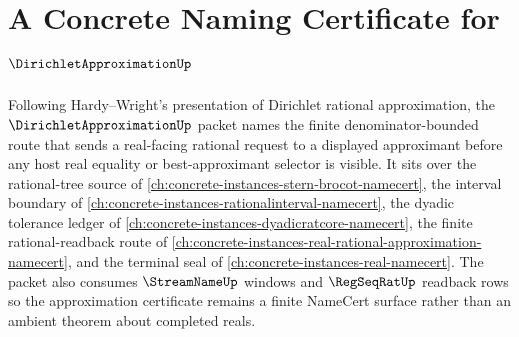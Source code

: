 \chapter{A Concrete Naming Certificate for $\DirichletApproximationUp$}
\label{ch:concrete-instances-dirichlet-approximation-namecert}

Following Hardy--Wright's presentation of Dirichlet rational approximation, the $\DirichletApproximationUp$ packet names the finite denominator-bounded route that sends a real-facing rational request to a displayed approximant before any host real equality or best-approximant selector is visible. It sits over the rational-tree source of \autoref{ch:concrete-instances-stern-brocot-namecert}, the interval boundary of \autoref{ch:concrete-instances-rationalinterval-namecert}, the dyadic tolerance ledger of \autoref{ch:concrete-instances-dyadicratcore-namecert}, the finite rational-readback route of \autoref{ch:concrete-instances-real-rational-approximation-namecert}, and the terminal seal of \autoref{ch:concrete-instances-real-namecert}. The packet also consumes $\StreamNameUp$ windows and $\RegSeqRatUp$ readback rows so the approximation certificate remains a finite NameCert surface rather than an ambient theorem about completed reals.

